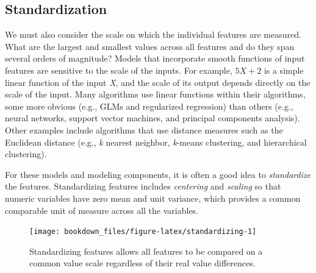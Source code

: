 \documentclass[]{krantz}
\makeatletter
\newenvironment{Shaded}{\begin{snugshade}}{\end{snugshade}}
\newcommand{\CommentTok}[1]{\textcolor[rgb]{0.37,0.37,0.37}{\textit{#1}}}
\newcommand{\DataTypeTok}[1]{\textcolor[rgb]{0.27,0.27,0.27}{#1}}
\newcommand{\KeywordTok}[1]{\textcolor[rgb]{0.27,0.27,0.27}{\textbf{#1}}}
\newcommand{\NormalTok}[1]{#1}
\newcommand{\OperatorTok}[1]{\textcolor[rgb]{0.43,0.43,0.43}{\textbf{#1}}}
\newcommand{\StringTok}[1]{\textcolor[rgb]{0.5,0.5,0.5}{#1}}
\newenvironment{kframe}{%
\medskip{}
\setlength{\fboxsep}{.8em}
 \def\at@end@of@kframe{}%
 \ifinner\ifhmode%
  \def\at@end@of@kframe{\end{minipage}}%
  \begin{minipage}{\columnwidth}%
 \fi\fi%
 \def\FrameCommand##1{\hskip\@totalleftmargin \hskip-\fboxsep
 \colorbox{shadecolor}{##1}\hskip-\fboxsep
     \hskip-\linewidth \hskip-\@totalleftmargin \hskip\columnwidth}%
 \MakeFramed {\advance\hsize-\width
   \@totalleftmargin\z@ \linewidth\hsize
   \@setminipage}}%
 {\par\unskip\endMakeFramed%
 \at@end@of@kframe}
\renewenvironment{Shaded}{\begin{kframe}}{\end{kframe}}
\makeatother
\begin{document}
\begin{Shaded}
\end{Shaded}

\hypertarget{standardization}{%
\subsection{Standardization}\label{standardization}}

We must also consider the scale on which the individual features are measured. What are the largest and smallest values across all features and do they span several orders of magnitude? Models that incorporate smooth functions of input features are sensitive to the scale of the inputs. For example, \(5X+2\) is a simple linear function of the input \emph{X}, and the scale of its output depends directly on the scale of the input. Many algorithms use linear functions within their algorithms, some more obvious (e.g., GLMs and regularized regression) than others (e.g., neural networks, support vector machines, and principal components analysis). Other examples include algorithms that use distance measures such as the Euclidean distance (e.g., \emph{k} nearest neighbor, \emph{k}-means clustering, and hierarchical clustering).

For these models and modeling components, it is often a good idea to \emph{standardize} the features. Standardizing features includes \emph{centering} and \emph{scaling} so that numeric variables have zero mean and unit variance, which provides a common comparable unit of measure across all the variables.

\begin{figure}

{\centering \texttt{[image: bookdown\_files/figure-latex/standardizing-1]} 

}

\caption{Standardizing features allows all features to be compared on a common value scale regardless of their real value differences.}\label{fig:standardizing}
\end{figure}
\end{document}
